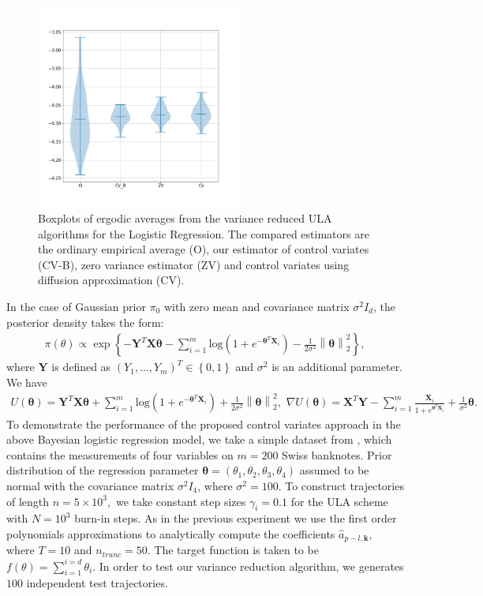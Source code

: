 \documentclass[bj]{imsart}
\begin{document}
\begin{figure}[h]
\begin{center}
\includegraphics[width=0.6\textwidth]{../pictures/BLR_banknotes_4d.png}
\caption{Boxplots of ergodic averages  from the variance reduced ULA algorithms for the Logistic Regression. The compared estimators are the ordinary empirical average  (O), our estimator of control variates (CV-B), zero variance estimator (ZV) and control variates using diffusion approximation (CV).
 \label{fig:2}}
\end{center}
\end{figure}
In the case of  Gaussian prior $\pi_0$ with zero mean and covariance matrix $\sigma^2 I_d$, the posterior density takes the form:
\begin{eqnarray*}
\pi(\theta) \propto \exp \left\{ -  \mathbf{Y}^T \mathbf{X \theta} - \sum_{i=1}^m \text{log} (1 + e^{-\mathbf{\theta}^T \mathbf{X}_i}) - \frac{1}{2\sigma^2} \left\| \mathbf{\theta}\right\|_2^2 \right\},
\end{eqnarray*}
where $\mathbf{Y}$ is defined as $(Y_1, \dots, Y_m)^T \in \left\{ 0,1\right\}$ and $\sigma^2 $ is an additional parameter. We have
\begin{eqnarray*}
U( \mathbf{\theta}) = \mathbf{Y}^T \mathbf{X \theta} + \sum_{i=1}^m \text{log} (1 + e^{-\mathbf{\theta}^T \mathbf{X}_i}) + \frac{1}{2\sigma^2} \left\|\mathbf{\theta}\right\|_2^2, \,\,
\nabla U(\mathbf{\theta}) = \mathbf{X}^T \mathbf{Y} - \sum_{i=1}^m \frac{\mathbf{X}_i}{1 + e^{\mathbf{\theta}^T \mathbf{X}_i}} + \frac{1}{\sigma^2} \mathbf{\theta}.
\end{eqnarray*}
To demonstrate the performance of the proposed control variates approach in the above Bayesian logistic regression model, we take a simple dataset from \cite{mira2013zero}, which contains the measurements of four variables on $m=200$ Swiss banknotes. Prior distribution of the regression parameter $\mathbf{\theta} = \left( \theta_1, \theta_2, \theta_3, \theta_4 \right)$ assumed to be normal with the covariance matrix $\sigma^2 I_4$, where $\sigma^2 = 100$. To construct trajectories of length $n = 5 \times 10^3, $ we take  constant step sizes $\gamma_i = 0.1$ for the ULA scheme with $N = 10^3$ burn-in steps. As in the previous experiment we use the first order polynomials approximations to analytically compute the coefficients $\hat{a}_{p-l,\mathbf{k}},$ where $T = 10$ and $n_{trunc} = 50$. The target function is taken to be $f(\theta) = \sum_{i=1}^{i=d}\theta_i$.  In order to test our variance reduction algorithm, we generates \(100\) independent test trajectories.
\end{document}
